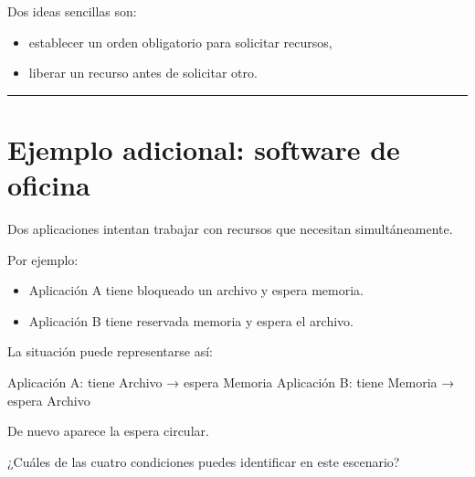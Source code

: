 \documentclass[
  spanish,
  letterpaper,
]{scrbook}
\newenvironment{Shaded}{\begin{snugshade}}{\end{snugshade}}
\newcommand{\NormalTok}[1]{\textcolor[rgb]{0.00,0.23,0.31}{#1}}
\providecommand{\tightlist}{%
  \setlength{\itemsep}{0pt}\setlength{\parskip}{0pt}}
\begin{document}
Dos ideas sencillas son:

\begin{itemize}
\tightlist
\item
  establecer un orden obligatorio para solicitar recursos,
\item
  liberar un recurso antes de solicitar otro.
\end{itemize}

\begin{center}\rule{0.5\linewidth}{0.5pt}\end{center}


\chapter{Ejemplo adicional: software de
oficina}\label{ejemplo-adicional-software-de-oficina}

Dos aplicaciones intentan trabajar con recursos que necesitan
simultáneamente.

Por ejemplo:

\begin{itemize}
\tightlist
\item
  Aplicación A tiene bloqueado un archivo y espera memoria.
\item
  Aplicación B tiene reservada memoria y espera el archivo.
\end{itemize}

La situación puede representarse así:

\begin{Shaded}
\begin{Highlighting}[]
\NormalTok{Aplicación A: tiene Archivo → espera Memoria}
\NormalTok{Aplicación B: tiene Memoria → espera Archivo}
\end{Highlighting}
\end{Shaded}

De nuevo aparece la espera circular.

\begin{tcolorbox}[enhanced jigsaw, arc=.35mm, bottomrule=.15mm, bottomtitle=1mm, breakable, colback=white, colbacktitle=quarto-callout-tip-color!10!white, colframe=quarto-callout-tip-color-frame, coltitle=black, left=2mm, leftrule=.75mm, opacityback=0, opacitybacktitle=0.6, rightrule=.15mm, title=\textcolor{quarto-callout-tip-color}{\faLightbulb}\hspace{0.5em}{Pregunta para analizar}, titlerule=0mm, toprule=.15mm, toptitle=1mm]

¿Cuáles de las cuatro condiciones puedes identificar en este escenario?

\end{tcolorbox}
\end{document}
